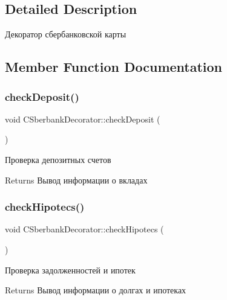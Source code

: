\subsection{Detailed Description}
Декоратор сбербанковской карты 

\subsection{Member Function Documentation}
\mbox{\label{classCSberbankDecorator_a0bee1976bcb32c4e927166aa3ab857d0}} 
\subsubsection{\texorpdfstring{check\+Deposit()}{checkDeposit()}}
{\footnotesize\ttfamily void C\+Sberbank\+Decorator\+::check\+Deposit (\begin{DoxyParamCaption}{ }\end{DoxyParamCaption})\hspace{0.3cm}{\ttfamily [inline]}}



Проверка депозитных счетов 

\begin{DoxyReturn}{Returns}
Вывод информации о вкладах 
\end{DoxyReturn}
\mbox{\label{classCSberbankDecorator_a60aedba1baefb930f51176b38d3682c5}} 
\subsubsection{\texorpdfstring{check\+Hipotecs()}{checkHipotecs()}}
{\footnotesize\ttfamily void C\+Sberbank\+Decorator\+::check\+Hipotecs (\begin{DoxyParamCaption}{ }\end{DoxyParamCaption})\hspace{0.3cm}{\ttfamily [inline]}}



Проверка задолженностей и ипотек 

\begin{DoxyReturn}{Returns}
Вывод информации о долгах и ипотеках 
\end{DoxyReturn}
\mbox{\label{classCSberbankDecorator_a4182d5c8d8d0214ad53c26ebe26cce09}} 
